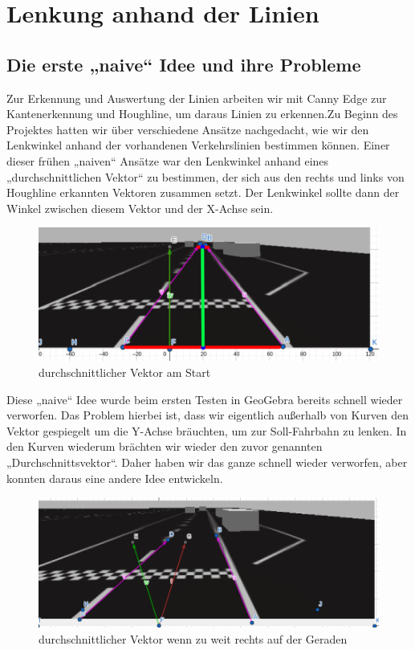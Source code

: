 \section{Lenkung anhand der Linien} %
\subsection{Die erste „naive“ Idee und ihre Probleme}
Zur Erkennung und Auswertung der Linien arbeiten wir mit Canny Edge zur Kantenerkennung und Houghline, um daraus Linien zu erkennen.Zu Beginn des Projektes hatten wir über verschiedene Ansätze nachgedacht, wie wir den Lenkwinkel anhand der vorhandenen Verkehrslinien bestimmen können. Einer dieser frühen „naiven“ Ansätze war den Lenkwinkel anhand eines „durchschnittlichen Vektor“ zu bestimmen, der sich aus den rechts und links von Houghline erkannten Vektoren zusammen setzt. Der Lenkwinkel sollte dann der Winkel zwischen diesem Vektor und der X-Achse sein. 
\begin{figure}[H]
	\centering	
	\includegraphics[width=.5\textwidth]{img/vector_gerade}
	\caption[durchschnittlichen Vektor am Start]{durchschnittlicher Vektor am Start}
	\label{fig:vector_gerade}
\end{figure}

Diese „naive“ Idee wurde beim ersten Testen in GeoGebra bereits schnell wieder verworfen. Das Problem hierbei ist, dass wir eigentlich außerhalb von Kurven  den Vektor gespiegelt um die Y-Achse bräuchten, um zur Soll-Fahrbahn zu lenken. In den Kurven wiederum brächten wir wieder den zuvor genannten „Durchschnittsvektor“. Daher haben wir das ganze schnell wieder verworfen, aber konnten daraus eine andere Idee entwickeln.

\begin{figure}[H]
	\centering	
	\includegraphics[width=.5\textwidth]{img/vector_zu_rechts}
	\caption[durchschnittlichen Vektor wenn zu weit rechts auf der Geraden]{durchschnittlicher Vektor wenn zu weit rechts auf der Geraden}
	\label{fig:vector_zu_rechts}
\end{figure}

